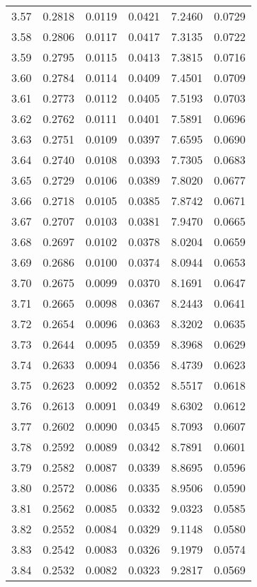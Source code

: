\documentclass{article}
\begin{document}
\begin{longtable}{cccccc}
3.57 & 0.2818 & 0.0119 & 0.0421 & 7.2460 & 0.0729 \\
3.58 & 0.2806 & 0.0117 & 0.0417 & 7.3135 & 0.0722 \\
3.59 & 0.2795 & 0.0115 & 0.0413 & 7.3815 & 0.0716 \\
3.60 & 0.2784 & 0.0114 & 0.0409 & 7.4501 & 0.0709 \\
3.61 & 0.2773 & 0.0112 & 0.0405 & 7.5193 & 0.0703 \\
3.62 & 0.2762 & 0.0111 & 0.0401 & 7.5891 & 0.0696 \\
3.63 & 0.2751 & 0.0109 & 0.0397 & 7.6595 & 0.0690 \\
3.64 & 0.2740 & 0.0108 & 0.0393 & 7.7305 & 0.0683 \\
3.65 & 0.2729 & 0.0106 & 0.0389 & 7.8020 & 0.0677 \\
3.66 & 0.2718 & 0.0105 & 0.0385 & 7.8742 & 0.0671 \\
3.67 & 0.2707 & 0.0103 & 0.0381 & 7.9470 & 0.0665 \\
3.68 & 0.2697 & 0.0102 & 0.0378 & 8.0204 & 0.0659 \\
3.69 & 0.2686 & 0.0100 & 0.0374 & 8.0944 & 0.0653 \\
3.70 & 0.2675 & 0.0099 & 0.0370 & 8.1691 & 0.0647 \\
3.71 & 0.2665 & 0.0098 & 0.0367 & 8.2443 & 0.0641 \\
3.72 & 0.2654 & 0.0096 & 0.0363 & 8.3202 & 0.0635 \\
3.73 & 0.2644 & 0.0095 & 0.0359 & 8.3968 & 0.0629 \\
3.74 & 0.2633 & 0.0094 & 0.0356 & 8.4739 & 0.0623 \\
3.75 & 0.2623 & 0.0092 & 0.0352 & 8.5517 & 0.0618 \\
3.76 & 0.2613 & 0.0091 & 0.0349 & 8.6302 & 0.0612 \\
3.77 & 0.2602 & 0.0090 & 0.0345 & 8.7093 & 0.0607 \\
3.78 & 0.2592 & 0.0089 & 0.0342 & 8.7891 & 0.0601 \\
3.79 & 0.2582 & 0.0087 & 0.0339 & 8.8695 & 0.0596 \\
3.80 & 0.2572 & 0.0086 & 0.0335 & 8.9506 & 0.0590 \\
3.81 & 0.2562 & 0.0085 & 0.0332 & 9.0323 & 0.0585 \\
3.82 & 0.2552 & 0.0084 & 0.0329 & 9.1148 & 0.0580 \\
3.83 & 0.2542 & 0.0083 & 0.0326 & 9.1979 & 0.0574 \\
3.84 & 0.2532 & 0.0082 & 0.0323 & 9.2817 & 0.0569 \\

\end{longtable}
\end{document}
